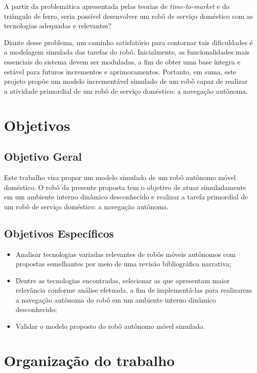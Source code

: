 A partir da problemática apresentada pelas teorias de \textit{time-to-market} e do triângulo de ferro, 
seria possível desenvolver um robô de serviço doméstico com as tecnologias adequadas e relevantes?

Diante desse problema, um caminho satisfatório para contornar tais dificuldades é a modelagem simulada das tarefas do robô. Inicialmente, as funcionalidades mais essenciais do sistema devem ser moduladas, a fim de obter uma base íntegra e estável para futuros incrementos e aprimoramentos. Portanto, em suma, este projeto propõe um modelo incrementável simulado de um robô capaz de realizar a atividade primordial de um robô de serviço doméstico: a navegação autônoma.

\section{Objetivos}
\label{sec-objetivos}

\subsection{Objetivo Geral}

Este trabalho visa propor um modelo simulado de um robô autônomo móvel doméstico. O robô da presente proposta tem o objetivo de atuar simuladamente em um ambiente interno dinâmico desconhecido e realizar a tarefa primordial de um robô de serviço doméstico: a navegação autônoma.

\subsection{Objetivos Específicos}
\begin{itemize}
  \item  Analisar tecnologias variadas relevantes de robôs móveis autônomos com propostas semelhantes por meio de uma revisão bibliográfica narrativa;
  \item Dentre as tecnologias encontradas, selecionar as que apresentam maior relevância conforme análise efetuada, a fim de implementá-las para realizarem a navegação autônoma do robô em um ambiente interno dinâmico desconhecido;
  \item Validar o modelo proposto do robô autônomo móvel simulado.
\end{itemize}

\section{Organização do trabalho}
\label{sec-organizacao}

